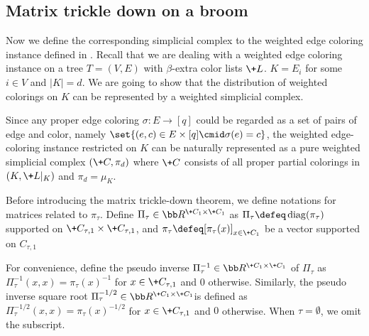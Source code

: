 \subsection{Matrix trickle down on a broom}

Now we define the corresponding simplicial complex to the weighted edge coloring instance defined in .
Recall that we are dealing with a weighted edge coloring instance on a tree $T=(V, E)$
with $\beta$-extra color lists $\+L$. $K = E_i$ for some $i\in V$ and $|K| = d$.
We are going to show that the distribution of weighted colorings on $K$ can be
represented by a weighted simplicial complex.

Since any proper edge coloring  $\sigma:E\rightarrow [q]$ could be regarded as a set of pairs of edge and color, namely $\set{(e,c)\in E\times [q]\cmid \sigma(e)=c}$, the weighted edge-coloring instance restricted on $K$ can be naturally represented as a pure weighted simplicial complex $(\+C,\pi_{d})$ where $\+C$ consists of all proper partial colorings in $(K,\+L|_K)$ and $\pi_{d}=\mu_K$.

Before introducing the matrix trickle-down theorem, we define notations for matrices related to $\pi_\tau$. Define $\Pi_\tau \in \bb R^{\+C_1\times\+C_1}$ as $\Pi_\tau \defeq \operatorname{diag}(\pi_\tau)$ supported on $\+C_{\tau,1}\times \+C_{\tau,1}$,
and $\pi_\tau\defeq[\pi_\tau(x)]_{x\in \+C_1}$ be a vector supported on $C_{\tau, 1}$

For convenience, define the pseudo inverse $\Pi_\tau^{-1} \in \bb R^{\+C_1\times\+C_1}$ of $\Pi_\tau$ as $\Pi_\tau^{-1}(x,x)=\pi_\tau(x)^{-1}$ for $x\in \+C_{\tau,1}$ and $0$ otherwise. Similarly, the pseudo inverse square root $\Pi_\tau^{-1/2} \in \bb R^{\+C_1\times\+C_1}$is defined as $\Pi_\tau^{-1/2}(x,x)=\pi_\tau(x)^{-1/2}$ for $x\in \+C_{\tau,1}$ and $0$ otherwise. When $\tau=\emptyset$, we omit the subscript.

